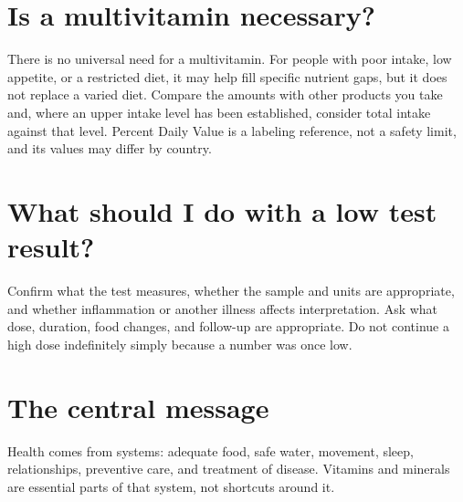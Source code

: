 \section{Is a multivitamin necessary?}
There is no universal need for a multivitamin. For people with poor intake, low appetite, or a restricted diet, it may help fill specific nutrient gaps, but it does not replace a varied diet. Compare the amounts with other products you take and, where an upper intake level has been established, consider total intake against that level. Percent Daily Value is a labeling reference, not a safety limit, and its values may differ by country. \cite{odsMVMS}

\section{What should I do with a low test result?}
Confirm what the test measures, whether the sample and units are appropriate, and whether inflammation or another illness affects interpretation. Ask what dose, duration, food changes, and follow-up are appropriate. Do not continue a high dose indefinitely simply because a number was once low.

\section{The central message}
Health comes from systems: adequate food, safe water, movement, sleep, relationships, preventive care, and treatment of disease. Vitamins and minerals are essential parts of that system, not shortcuts around it.

